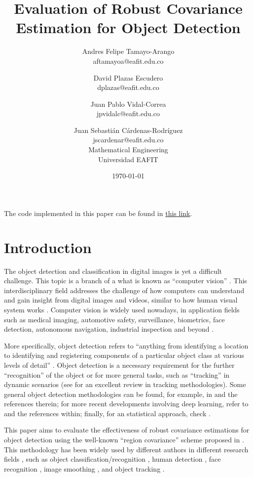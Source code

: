 \documentclass[11pt]{article}
\title{Evaluation of Robust Covariance Estimation for Object Detection}
\author{Andres Felipe Tamayo-Arango \\
  aftamayoa@eafit.edu.co \and
  David Plazas Escudero \\
  dplazas@eafit.edu.co \and
  Juan Pablo Vidal-Correa \\
  jpvidalc@eafit.edu.co \and
  Juan Sebasti\'an C\'ardenas-Rodríguez \\
  jscardenar@eafit.edu.co \\[0.5cm]
  Mathematical Engineering \\
  Universidad EAFIT}
\date{\today}
\theoremstyle{definition}
\theoremstyle{remark}
\theoremstyle{remark}
\theoremstyle{remark}
\begin{document}
\maketitle

The code implemented in this paper can be found in
\href{https://bit.ly/3rQbVRQ}{this link}.

\section{Introduction}\label{sec_int}
The object detection and classification in digital images is yet a difficult challenge. This topic is a branch of a what is known as ``computer vision'' \parencite{amit20022d}. This interdisciplinary field addresses the challenge of how computers can understand and gain insight from digital images and videos, similar to how human visual system works \cite{ballard1982computer,huang1996computer,amit20022d,szeliski2010computer}. Computer vision is widely used nowadays, in application fields such as medical imaging, automotive safety, surveillance, biometrics, face detection, autonomous navigation, industrial inspection and beyond \cite{huang1996computer,szeliski2010computer}.

More specifically, object detection refers to ``anything from identifying a location to identifying and registering components of a particular object class at various levels of detail'' \parencite{amit20022d}. Object detection is a necessary requirement for the further ``recognition'' of the object or for more general tasks, such as ``tracking'' in dynamic scenarios (see \cite{li2013survey} for an excellent review in tracking methodologies). Some general object detection methodologies can be found, for example, in \cite{amit20022d,szeliski2010computer} and the references therein; for more recent developments involving deep learning, refer to \cite{jiang2018deep,zhao2019object} and the references within; finally, for an statistical approach, check \cite{li2015feature}.

This paper aims to evaluate the effectiveness of robust covariance estimations for object detection using the well-known ``region covariance'' scheme proposed in \parencite{tuzel2006}. This methodology has been widely used by different authors in different research fields \cite{wu2012real}, such as object classification/recognition \cite{hong2009sigma,sivalingam2010tensor,tosato2010multi}, human detection \cite{paisitkriangkrai2008fast,tuzel2007human,yao2007fast,hirzer2011person}, face recognition \cite{pang2008gabor,hariri20163d}, image smoothing \cite{karacan2013structure}, and object tracking \cite{porikli2006covariance,wu2008probabilistic,wu2009real,wu2009robust}.
\end{document}
